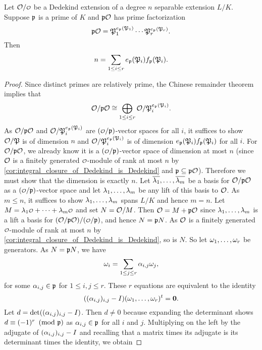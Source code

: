     \begin{theorem*}
      Let $\mc{O}/\smc{O}$ be a Dedekind extension of a degree $n$ separable extension $L/K$. Suppose $\mathfrak{p}$ is a prime of $K$ and $\mathfrak{p}\mathcal{O}$ has prime factorization
      \[
        \mathfrak{p}\mathcal{O} = \mathfrak{P}_{1}^{e_{\mathfrak{p}}(\mathfrak{P}_{1})} \cdots \mathfrak{P}_{r}^{e_{\mathfrak{p}}(\mathfrak{P}_{r})}.
      \]
      Then
      \[
        n = \sum_{1 \le i \le r}e_{\mathfrak{p}}(\mathfrak{P}_{i})f_{\mathfrak{p}}(\mathfrak{P}_{i}).
      \]
    \end{theorem*}
    \begin{proof}
      Since distinct primes are relatively prime, the Chinese remainder theorem implies that
      \[
        \mathcal{O}/\mathfrak{p}\mathcal{O} \cong \bigoplus_{1 \le i \le r} \mathcal{O}/\mathfrak{P}_{i}^{e_{\mathfrak{p}}(\mathfrak{P}_{i})}.
      \]
      As $\mathcal{O}/\mathfrak{p}\mathcal{O}$ and $\mathcal{O}/\mathfrak{P}_{i}^{e_{\mathfrak{p}}(\mathfrak{P}_{i})}$ are $(\smc{O}/\mf{p})$-vector spaces for all $i$, it suffices to show $\mathcal{O}/\mathfrak{P}$ is of dimension $n$ and $\mathcal{O}/\mathfrak{P}_{i}^{e_{\mathfrak{p}}(\mathfrak{P}_{i})}$ is of dimension $e_{\mathfrak{p}}(\mathfrak{P}_{i})f_{\mathfrak{p}}(\mathfrak{P}_{i})$ for all $i$. For $\mathcal{O}/\mathfrak{p}\mathcal{O}$, we already know it is a $(\smc{O}/\mf{p})$-vector space of dimension at most $n$ (since $\mathcal{O}$ is a finitely generated $\smc{O}$-module of rank at most $n$ by \cref{cor:integral_closure_of_Dedekind_is_Dedekind} and $\mathfrak{p} \subseteq \mathfrak{p}\mathcal{O}$). Therefore we must show that the dimension is exactly $n$. Let $\overline{\lambda_{1}},\ldots,\overline{\lambda_{m}}$ be a basis for $\mathcal{O}/\mathfrak{p}\mathcal{O}$ as a $(\smc{O}/\mf{p})$-vector space and let $\lambda_{1},\ldots,\lambda_{m}$ be any lift of this basis to $\mathcal{O}$. As $m \le n$, it suffices to show $\lambda_{1},\ldots,\lambda_{m}$ spans $L/K$ and hence $m = n$. Let $M = \l_{1}\smc{O}+\cdots+\l_{m}\smc{O}$ and set $N = \mathcal{O}/M$. Then $\mathcal{O} = M+\mathfrak{p}\mathcal{O}$ since $\lambda_{1},\ldots,\lambda_{m}$ is a lift a basis for $(\mc{O}/\mf{p}\mc{O})/(\smc{O}/\mf{p})$, and hence $N = \mathfrak{p}N$. As $\mathcal{O}$ is a finitely generated $\smc{O}$-module of rank at most $n$ by \cref{cor:integral_closure_of_Dedekind_is_Dedekind}, so is $N$. So let $\omega_{1},\ldots,\omega_{r}$ be generators. As $N = \mathfrak{p}N$, we have
      \[
        \omega_{i} = \sum_{1 \le j \le r}\alpha_{i,j}\omega_{j},
      \]
      for some $\alpha_{i,j} \in \mathfrak{p}$ for $1 \le i,j \le r$. These $r$ equations are equivalent to the identity
      \[
        ((\alpha_{i,j})_{i,j}-I)(\omega_{1},\ldots,\omega_{r})^{t} = \mathbf{0}.
      \]
      Let $d = \det((\alpha_{i,j})_{i,j}-I)$. Then $d \neq 0$ because expanding the determinant shows $d \equiv (-1)^{r} \ \left(\text{mod }\mathfrak{p}\right)$ as $\alpha_{i,j} \in \mathfrak{p}$ for all $i$ and $j$. Multiplying on the left by the adjugate of $(\alpha_{i,j})_{i,j}-I$ and recalling that a matrix times its adjugate is its determinant times the identity, we obtain

\end{proof}
